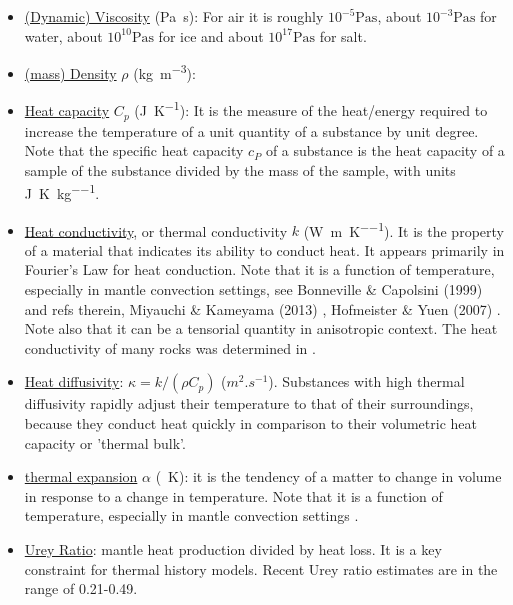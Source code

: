 \begin{itemize}
\item \underline{(Dynamic) Viscosity} (\si{\pascal\second}): 
For air it is roughly $10^{-5}\si{\pascal\second}$, 
about $10^{-3}\si{\pascal\second}$ for water, 
about $10^{10}\si{\pascal\second}$ for ice and 
about $10^{17}\si{\pascal\second}$ for salt. 

\item \underline{(mass) Density} $\rho$ (\si{\kg\per\cubic\metre}):

\item \underline{Heat capacity} $C_p$ (\si{\joule\per\kelvin}): 
It is the measure of the heat/energy required to increase the 
temperature of a unit quantity of a substance by unit degree. Note that the specific 
heat capacity $c_P$ of a substance is the heat capacity of a sample of the substance 
divided by the mass of the sample, with units \si{\joule\per\kelvin\per\kg}.

\item \underline{Heat conductivity}, or thermal conductivity $k$ (\si{\watt\per\metre\per\kelvin}). 
It is the property of a material that indicates its ability to conduct heat. It appears primarily 
in Fourier's Law for heat conduction.
Note that it is a function of temperature, especially in mantle convection settings,
see Bonneville \& Capolsini (1999) \cite{boca99} and refs therein, 
Miyauchi \& Kameyama (2013) \cite{mika13}, Hofmeister \& Yuen (2007) \cite{hoyu07}. 
Note also that it can be a tensorial quantity in anisotropic context.
The heat conductivity of many rocks was determined in \cite{ando13}.

\item \underline{Heat diffusivity}: $\kappa=k/(\rho C_p)$ ($m^2.s^{-1}$). Substances with 
high thermal diffusivity rapidly adjust their temperature to that of their surroundings, because they 
conduct heat quickly in comparison to their volumetric heat capacity or 'thermal bulk'.

\item \underline{thermal expansion} $\alpha$ (\si{\per\kelvin}): 
it is the tendency of a matter to change in volume in response to a change in temperature. 
Note that it is a function of temperature, especially in mantle convection settings \cite{mika13}.

\item \underline{Urey Ratio}: mantle heat production divided by heat loss. It is a key constraint 
for thermal history models. Recent Urey ratio estimates are in the range of 0.21-0.49. \cite{lecm11}


\end{itemize}
